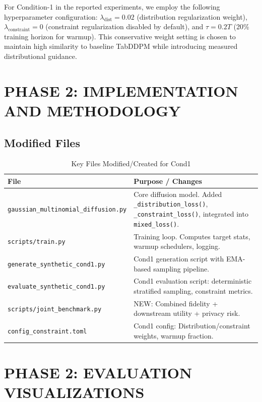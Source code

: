 \documentclass[10pt,conference,a4paper]{IEEEtran}
\begin{document}
For Condition-1 in the reported experiments, we employ the following hyperparameter configuration: $\lambda_{\text{dist}} = 0.02$ (distribution regularization weight), $\lambda_{\text{constraint}} = 0$ (constraint regularization disabled by default), and $\tau = 0.2T$ (20\% training horizon for warmup). This conservative weight setting is chosen to maintain high similarity to baseline TabDDPM while introducing measured distributional guidance.

\section{PHASE 2: IMPLEMENTATION AND METHODOLOGY}

\subsection{Modified Files}
\begin{table}[htbp]
\centering
\caption{Key Files Modified/Created for Cond1}
\label{tab:files}
\begin{tabularx}{\columnwidth}{>{\raggedright\arraybackslash}p{4cm} >{\raggedright\arraybackslash}X }
\toprule
\textbf{File} & \textbf{Purpose / Changes} \\
\midrule
\texttt{gaussian\_multinomial\_diffusion.py} & Core diffusion model. Added \texttt{\_distribution\_loss()}, \texttt{\_constraint\_loss()}, integrated into \texttt{mixed\_loss()}. \\
\texttt{scripts/train.py} & Training loop. Computes target stats, warmup schedulers, logging. \\
\texttt{generate\_synthetic\_cond1.py} & Cond1 generation script with EMA-based sampling pipeline. \\
\texttt{evaluate\_synthetic\_cond1.py} & Cond1 evaluation script: deterministic stratified sampling, constraint metrics. \\
\texttt{scripts/joint\_benchmark.py} & NEW: Combined fidelity + downstream utility + privacy risk. \\
\texttt{config\_constraint.toml} & Cond1 config: Distribution/constraint weights, warmup fraction. \\
\bottomrule
\end{tabularx}
\end{table}

\section{PHASE 2: EVALUATION VISUALIZATIONS}
\end{document}
